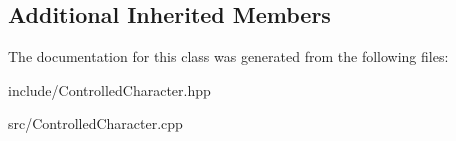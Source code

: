 \subsection*{Additional Inherited Members}


The documentation for this class was generated from the following files\-:\begin{DoxyCompactItemize}
\item 
include/Controlled\-Character.\-hpp\item 
src/Controlled\-Character.\-cpp\end{DoxyCompactItemize}
